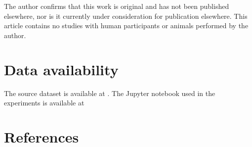 \documentclass[12pt]{article}
\begin{document}
The author confirms that this work is original and has not been published elsewhere, nor is it currently under consideration for publication elsewhere. This article contains no studies with human participants or animals performed by the author.

\section*{Data availability}

The source dataset is available at \cite{warwick_nash_abalone_1994}. The Jupyter notebook used in the experiments is available at \cite{mykhaylov_general_nodate}

\section*{References}
\printbibliography[heading=none]
\end{document}

